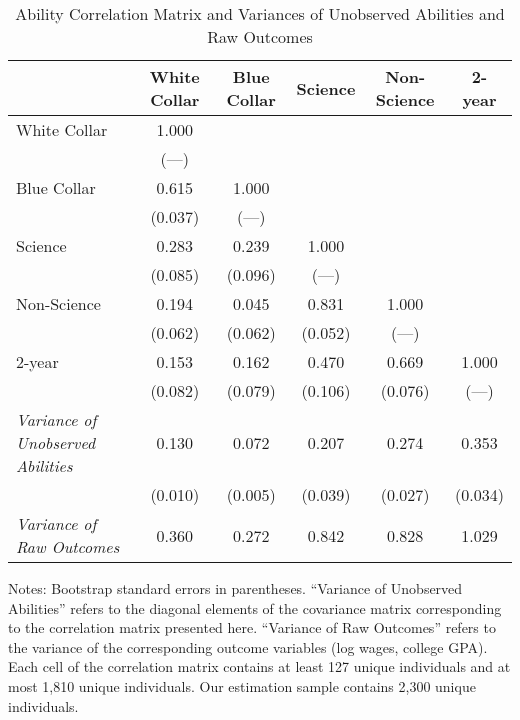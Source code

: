 \begin{table}[ht]
\caption{Ability Correlation Matrix and Variances of Unobserved Abilities and Raw Outcomes}
\label{tab:cov}
\centering
\begin{threeparttable}
\begin{tabular}{lccccc}
\toprule
 & White Collar & Blue Collar & Science & Non-Science & 2-year \\ 
\midrule
White Collar & 1.000 & & & & \\ 
 & (---) & & & & \\ 
Blue Collar & 0.615 & 1.000 & & & \\ 
 & (0.037) & (---) & & & \\ 
Science & 0.283 & 0.239 & 1.000 & & \\ 
 & (0.085) & (0.096) & (---) & & \\ 
Non-Science & 0.194 & 0.045 & 0.831 & 1.000 & \\ 
 & (0.062) & (0.062) & (0.052) & (---) & \\ 
2-year & 0.153 & 0.162 & 0.470 & 0.669 & 1.000 \\ 
 & (0.082) & (0.079) & (0.106) & (0.076) & (---) \\ 
\midrule
\textit{Variance of Unobserved Abilities}  & 0.130 & 0.072 & 0.207 & 0.274 & 0.353 \\ 
 & (0.010) & (0.005) & (0.039) & (0.027) & (0.034) \\ 
\midrule
\textit{Variance of Raw Outcomes}  & 0.360 & 0.272 & 0.842 & 0.828 & 1.029 \\ 
\bottomrule
\end{tabular}
\footnotesize Notes: Bootstrap standard errors in parentheses. ``Variance of Unobserved Abilities'' refers to the diagonal elements of the covariance matrix corresponding to the correlation matrix presented here. ``Variance of Raw Outcomes'' refers to the variance of the corresponding outcome variables (log wages, college GPA). Each cell of the correlation matrix contains at least  127 unique individuals and at most 1,810 unique individuals. Our estimation sample contains 2,300 unique individuals. 
\end{threeparttable}
\end{table}
